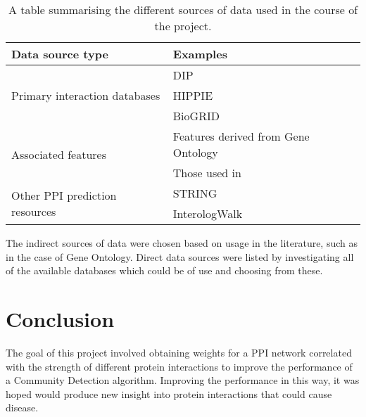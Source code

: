\begin{table}
    \centering
    \small
    \begin{tabular}{p{} p{}}
        Data source type                                & Examples \\
        \hline
        \multirow{3}{*}{\parbox{0.2\textwidth}{Primary interaction databases}}  & \ac{DIP}\autocite{xenarios_dip_2002} \\
                                                        & \ac{HIPPIE}\autocite{schaefer_hippie:_2012} \\ 
                                                        & BioGRID\autocite{stark_biogrid:_2006} \\
        \hline
        \multirow{2}{*}{\parbox{0.2\textwidth}{Associated features}}            & Features derived from Gene Ontology\autocite{ashburner_gene_2000} \\
                                                        & Those used in \textcite{rodgers-melnick_predicting_2013} \\
        \hline
        \multirow{2}{*}{\parbox{0.2\textwidth}{Other \ac{PPI} prediction resources}} & \ac{STRING}\autocite{von_mering_string:_2005} \\
                                                        & InterologWalk\autocite{gallone_bio::homology::interologwalk_2011} \\
    \end{tabular}
    \caption{A table summarising the different sources of data used in the course of the project.}
    \label{tab:sources}
\end{table}

The indirect sources of data were chosen based on usage in the literature, such as in the case of Gene Ontology\autocite{qi_evaluation_2006}. 
Direct data sources were listed by investigating all of the available databases which could be of use and choosing from these.
\section*{Conclusion}

The goal of this project involved obtaining weights for a \ac{PPI} network correlated with the strength of different protein interactions to improve the performance of a Community Detection algorithm.
Improving the performance in this way, it was hoped would produce new insight into protein interactions that could cause disease.


